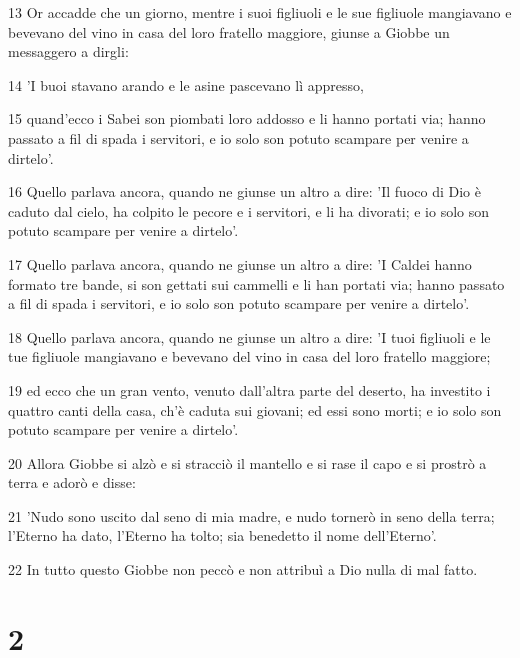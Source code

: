 \par 13 Or accadde che un giorno, mentre i suoi figliuoli e le sue figliuole mangiavano e bevevano del vino in casa del loro fratello maggiore, giunse a Giobbe un messaggero a dirgli:
\par 14 'I buoi stavano arando e le asine pascevano lì appresso,
\par 15 quand'ecco i Sabei son piombati loro addosso e li hanno portati via; hanno passato a fil di spada i servitori, e io solo son potuto scampare per venire a dirtelo'.
\par 16 Quello parlava ancora, quando ne giunse un altro a dire: 'Il fuoco di Dio è caduto dal cielo, ha colpito le pecore e i servitori, e li ha divorati; e io solo son potuto scampare per venire a dirtelo'.
\par 17 Quello parlava ancora, quando ne giunse un altro a dire: 'I Caldei hanno formato tre bande, si son gettati sui cammelli e li han portati via; hanno passato a fil di spada i servitori, e io solo son potuto scampare per venire a dirtelo'.
\par 18 Quello parlava ancora, quando ne giunse un altro a dire: 'I tuoi figliuoli e le tue figliuole mangiavano e bevevano del vino in casa del loro fratello maggiore;
\par 19 ed ecco che un gran vento, venuto dall'altra parte del deserto, ha investito i quattro canti della casa, ch'è caduta sui giovani; ed essi sono morti; e io solo son potuto scampare per venire a dirtelo'.
\par 20 Allora Giobbe si alzò e si stracciò il mantello e si rase il capo e si prostrò a terra e adorò e disse:
\par 21 'Nudo sono uscito dal seno di mia madre, e nudo tornerò in seno della terra; l'Eterno ha dato, l'Eterno ha tolto; sia benedetto il nome dell'Eterno'.
\par 22 In tutto questo Giobbe non peccò e non attribuì a Dio nulla di mal fatto.

\chapter{2}

